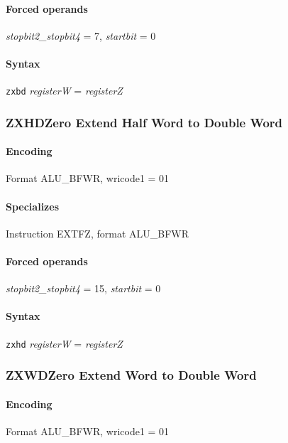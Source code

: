 {\paragraph{Forced operands} \emph{stopbit2\_stopbit4} = 7, \emph{startbit} = 0

\paragraph{Syntax} \texttt{zxbd} \emph{registerW} = \emph{registerZ}
\newpage
\subsubsection[{\small ZXHD: Zero Extend Half Word to Double Word}]{ZXHD\hfill Zero Extend Half Word to Double Word}
\label{instr:ZXHD}

\paragraph{Encoding} Format \textsf{ALU\_BFWR, wricode1 = 01}\\



\paragraph{Specializes} Instruction EXTFZ, format ALU\_BFWR

\paragraph{Forced operands} \emph{stopbit2\_stopbit4} = 15, \emph{startbit} = 0

\paragraph{Syntax} \texttt{zxhd} \emph{registerW} = \emph{registerZ}
\newpage
\subsubsection[{\small ZXWD: Zero Extend Word to Double Word}]{ZXWD\hfill Zero Extend Word to Double Word}
\label{instr:ZXWD}

\paragraph{Encoding} Format \textsf{ALU\_BFWR, wricode1 = 01}\\

}
